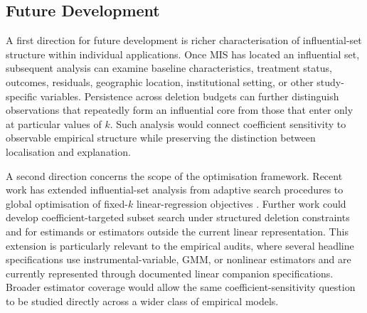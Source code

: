 \documentclass[../main.tex]{subfiles}
\begin{document}
\subsection{Future Development}

A first direction for future development is richer characterisation of influential-set structure within individual applications. Once MIS has located an influential set, subsequent analysis can examine baseline characteristics, treatment status, outcomes, residuals, geographic location, institutional setting, or other study-specific variables. Persistence across deletion budgets can further distinguish observations that repeatedly form an influential core from those that enter only at particular values of \(k\). Such analysis would connect coefficient sensitivity to observable empirical structure while preserving the distinction between localisation and explanation.

A second direction concerns the scope of the optimisation framework. Recent work has extended influential-set analysis from adaptive search procedures to global optimisation of fixed-\(k\) linear-regression objectives \parencite{kuschnig2021hidden,konrad2026finding}. Further work could develop coefficient-targeted subset search under structured deletion constraints and for estimands or estimators outside the current linear representation. This extension is particularly relevant to the empirical audits, where several headline specifications use instrumental-variable, GMM, or nonlinear estimators and are currently represented through documented linear companion specifications. Broader estimator coverage would allow the same coefficient-sensitivity question to be studied directly across a wider class of empirical models.
\end{document}
